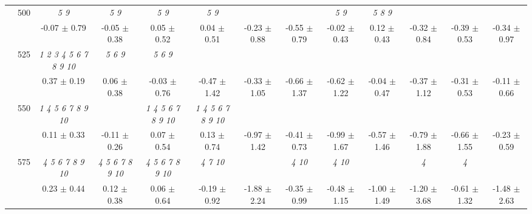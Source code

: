 \begin{table}[h]
{\begin{tabular}{
        ccccccccccccc}
 & \multirow{2}{*}{500}& \textit{ 5 9 }& \textit{ 5 9 }& \textit{ 5 9 }& \textit{ 5 9 }& & & \textit{ 5 9 }& \textit{ 5 8 9 }& & &  \\ 
 & & -0.07 $\pm$ 0.79& -0.05 $\pm$ 0.38& 0.05 $\pm$ 0.52& 0.04 $\pm$ 0.51& -0.23 $\pm$ 0.88& -0.55 $\pm$ 0.79& -0.02 $\pm$ 0.43& 0.12 $\pm$ 0.43& -0.32 $\pm$ 0.84& -0.39 $\pm$ 0.53& -0.34 $\pm$ 0.97 \\ 
 & \multirow{2}{*}{525}& \cellcolor[HTML]{EFEFEF} \textit{  1  2  3  4  5  6  7  8  9 10 }& \cellcolor[HTML]{EFEFEF} \textit{ 5 6 9 }& \cellcolor[HTML]{EFEFEF} \textit{ 5 6 9 }& \cellcolor[HTML]{EFEFEF} & \cellcolor[HTML]{EFEFEF} & \cellcolor[HTML]{EFEFEF} & \cellcolor[HTML]{EFEFEF} & \cellcolor[HTML]{EFEFEF} & \cellcolor[HTML]{EFEFEF} & \cellcolor[HTML]{EFEFEF} & \cellcolor[HTML]{EFEFEF}  \\ 
 & & \cellcolor[HTML]{EFEFEF} 0.37 $\pm$ 0.19& \cellcolor[HTML]{EFEFEF} 0.06 $\pm$ 0.38& \cellcolor[HTML]{EFEFEF} -0.03 $\pm$ 0.76& \cellcolor[HTML]{EFEFEF} -0.47 $\pm$ 1.42& \cellcolor[HTML]{EFEFEF} -0.33 $\pm$ 1.05& \cellcolor[HTML]{EFEFEF} -0.66 $\pm$ 1.37& \cellcolor[HTML]{EFEFEF} -0.62 $\pm$ 1.22& \cellcolor[HTML]{EFEFEF} -0.04 $\pm$ 0.47& \cellcolor[HTML]{EFEFEF} -0.37 $\pm$ 1.12& \cellcolor[HTML]{EFEFEF} -0.31 $\pm$ 0.53& \cellcolor[HTML]{EFEFEF} -0.11 $\pm$ 0.66 \\ 
 & \multirow{2}{*}{550}& \textit{  1  4  5  6  7  8  9 10 }& & \textit{  1  4  5  6  7  8  9 10 }& \textit{  1  4  5  6  7  8  9 10 }& & & & & & &  \\ 
 & & 0.11 $\pm$ 0.33& -0.11 $\pm$ 0.26& 0.07 $\pm$ 0.54& 0.13 $\pm$ 0.74& -0.97 $\pm$ 1.42& -0.41 $\pm$ 0.73& -0.99 $\pm$ 1.67& -0.57 $\pm$ 1.46& -0.79 $\pm$ 1.88& -0.66 $\pm$ 1.55& -0.23 $\pm$ 0.59 \\ 
 & \multirow{2}{*}{575}& \cellcolor[HTML]{EFEFEF} \textit{  4  5  6  7  8  9 10 }& \cellcolor[HTML]{EFEFEF} \textit{  4  5  6  7  8  9 10 }& \cellcolor[HTML]{EFEFEF} \textit{  4  5  6  7  8  9 10 }& \cellcolor[HTML]{EFEFEF} \textit{  4  7 10 }& \cellcolor[HTML]{EFEFEF} & \cellcolor[HTML]{EFEFEF} \textit{  4 10 }& \cellcolor[HTML]{EFEFEF} \textit{  4 10 }& \cellcolor[HTML]{EFEFEF} & \cellcolor[HTML]{EFEFEF} \textit{ 4 }& \cellcolor[HTML]{EFEFEF} \textit{ 4 }& \cellcolor[HTML]{EFEFEF}  \\ 
 & & \cellcolor[HTML]{EFEFEF} 0.23 $\pm$ 0.44& \cellcolor[HTML]{EFEFEF} 0.12 $\pm$ 0.38& \cellcolor[HTML]{EFEFEF} 0.06 $\pm$ 0.64& \cellcolor[HTML]{EFEFEF} -0.19 $\pm$ 0.92& \cellcolor[HTML]{EFEFEF} -1.88 $\pm$ 2.24& \cellcolor[HTML]{EFEFEF} -0.35 $\pm$ 0.99& \cellcolor[HTML]{EFEFEF} -0.48 $\pm$ 1.15& \cellcolor[HTML]{EFEFEF} -1.00 $\pm$ 1.49& \cellcolor[HTML]{EFEFEF} -1.20 $\pm$ 3.68& \cellcolor[HTML]{EFEFEF} -0.61 $\pm$ 1.32& \cellcolor[HTML]{EFEFEF} -1.48 $\pm$ 2.63 \\ 

\end{tabular}}
\end{table}

